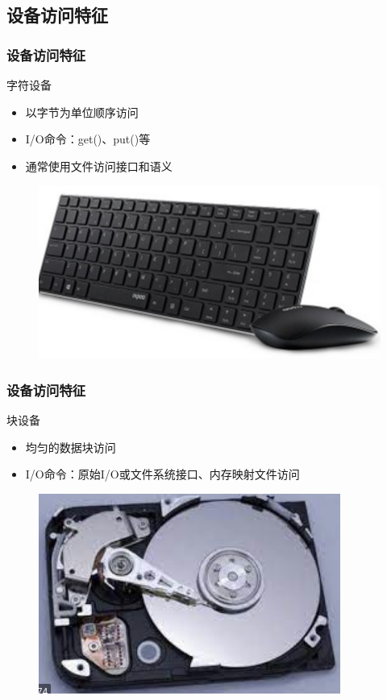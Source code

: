 \subsection{设备访问特征} %
\begin{frame}[fragile]
    \frametitle{设备访问特征}
    字符设备
    \begin{itemize}
        \item 以字节为单位顺序访问
        \item I/O命令：get()、put()等
        \item 通常使用文件访问接口和语义
    \end{itemize}
    \begin{figure}
    \includegraphics[width=0.4\linewidth]{figs/char-dev.png}
    \end{figure}
\end{frame}
% 
\begin{frame}[fragile]
    \frametitle{设备访问特征}
    块设备
    \begin{itemize}
        \item 均匀的数据块访问
        \item I/O命令：原始I/O或文件系统接口、内存映射文件访问
    \end{itemize}
    \begin{figure}
        \includegraphics[width=0.3\linewidth]{figs/blk-dev.png}
    \end{figure}
\end{frame}
% 
